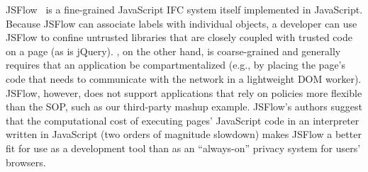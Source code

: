 JSFlow~\cite{JSFlow} is a fine-grained JavaScript IFC system itself
implemented in JavaScript.
%
Because JSFlow can associate labels with individual objects, a
developer can use JSFlow to confine untrusted libraries that are
closely coupled with trusted code on a page (as is jQuery).
%
\sys{}, on the other hand, is coarse-grained and
generally
requires that an application be compartmentalized (e.g., by placing the
page's code that needs to communicate with the network in a lightweight
DOM worker).
%
%
JSFlow, however, does not support applications that rely on policies
more flexible than the SOP, such as our third-party mashup example.
%
%
%
JSFlow's authors suggest that the computational cost of executing pages' JavaScript
code in an interpreter written in JavaScript (two orders of magnitude
slowdown) makes JSFlow a better fit for use as a development tool than
as an ``always-on'' privacy system for users' browsers.






